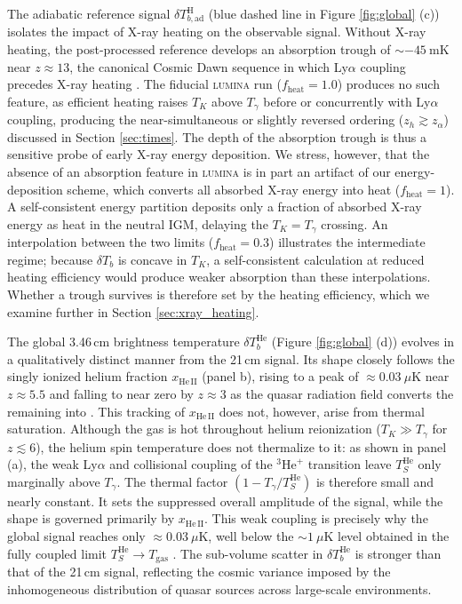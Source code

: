 \documentclass[apj,twocolumn, appendixfloats, twocolappendix, numberedappendix, tighten]{openjournal}
\DeclareRobustCommand{\lumina}{\mbox{\textsc{lumina}}\xspace}
\begin{document}
The adiabatic reference signal $\delta T_{b,\mathrm{ad}}^\mathrm{H}$ (blue dashed line in Figure \ref{fig:global} (c)) isolates the impact of X-ray heating on the observable signal. Without X-ray heating, the post-processed reference develops an absorption trough of $\sim -45\ \mathrm{mK}$ near $z \approx 13$, the canonical Cosmic Dawn sequence in which Ly$\alpha$ coupling precedes X-ray heating \citep[see][]{Furlanetto2006, Pritchard2012}. The fiducial \lumina run ($f_\mathrm{heat} = 1.0$) produces no such feature, as efficient heating raises $T_K$ above $T_\gamma$ before or concurrently with Ly$\alpha$ coupling, producing the near-simultaneous or slightly reversed ordering ($z_h \gtrsim z_\alpha$) discussed in Section \ref{sec:times}. The depth of the absorption trough is thus a sensitive probe of early X-ray energy deposition. We stress, however, that the absence of an absorption feature in \lumina is in part an artifact of our energy-deposition scheme, which converts all absorbed X-ray energy into heat ($f_\mathrm{heat} = 1$). A self-consistent energy partition \citep[e.g.][]{Shull1985, Furlanetto2010} deposits only a fraction of absorbed X-ray energy as heat in the neutral IGM, delaying the $T_K = T_\gamma$ crossing. An interpolation between the two limits ($f_\mathrm{heat}=0.3$) illustrates the intermediate regime; because $\delta T_b$ is concave in $T_K$, a self-consistent calculation at reduced heating efficiency would produce weaker absorption than these interpolations. Whether a trough survives is therefore set by the heating efficiency, which we examine further in Section \ref{sec:xray_heating}.





The global 3.46\,cm brightness temperature $\delta T_b^\mathrm{He}$ (Figure \ref{fig:global} (d)) evolves in a qualitatively distinct manner from the 21\,cm signal.  Its shape closely follows the singly ionized helium fraction $x_\mathrm{He\,II}$ (panel b), rising to a peak of $\approx 0.03\ \mu\mathrm{K}$ near $z \approx 5.5$ and falling to near zero by $z \approx 3$ as the quasar radiation field converts the remaining  into . This tracking of $x_\mathrm{He\,II}$ does not, however, arise from thermal saturation. Although the gas is hot throughout helium reionization ($T_K \gg T_\gamma$ for $z \lesssim 6$), the helium spin temperature does not thermalize to it: as shown in panel (a), the weak  Ly$\alpha$ and collisional coupling of the $^{3}\mathrm{He}^{+}$ transition leave $T_S^\mathrm{He}$ only marginally above $T_\gamma$. The thermal factor $(1 - T_\gamma/T_S^\mathrm{He})$ is therefore small and nearly constant. It sets the suppressed overall amplitude of the signal, while the shape is governed primarily by $x_\mathrm{He\,II}$. This weak coupling is precisely why the global signal reaches only $\approx 0.03\ \mu\mathrm{K}$, well below the $\sim 1\ \mu\mathrm{K}$ level obtained in the fully coupled limit $T_S^\mathrm{He} \to T_\mathrm{gas}$ \citep[][]{Khullar2020, Basu2026}. The sub-volume scatter in $\delta T_b^\mathrm{He}$ is stronger than that of the 21\,cm signal, reflecting the cosmic variance imposed by the inhomogeneous distribution of quasar sources across large-scale environments.
\end{document}
